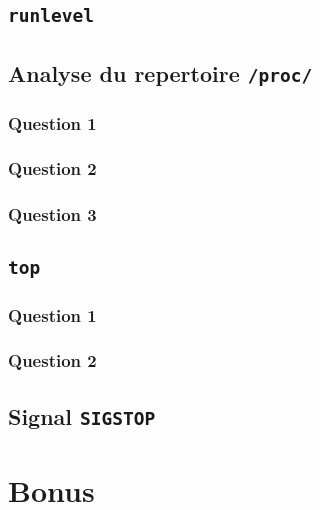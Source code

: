 \documentclass[]{article}
\begin{document}
\hypertarget{runlevel}{%
\subsection{\texorpdfstring{\texttt{runlevel}}{runlevel}}\label{runlevel}}

\hypertarget{analyse-du-repertoire-proc}{%
\subsection{\texorpdfstring{Analyse du repertoire
\texttt{/proc/}}{Analyse du repertoire /proc/}}\label{analyse-du-repertoire-proc}}

\hypertarget{question-1-5}{%
\subsubsection{Question 1}\label{question-1-5}}

\hypertarget{question-2-2}{%
\subsubsection{Question 2}\label{question-2-2}}

\hypertarget{question-3-1}{%
\subsubsection{Question 3}\label{question-3-1}}

\hypertarget{top}{%
\subsection{\texorpdfstring{\texttt{top}}{top}}\label{top}}

\hypertarget{question-1-6}{%
\subsubsection{Question 1}\label{question-1-6}}

\hypertarget{question-2-3}{%
\subsubsection{Question 2}\label{question-2-3}}

\hypertarget{signal-sigstop}{%
\subsection{\texorpdfstring{Signal
\texttt{SIGSTOP}}{Signal SIGSTOP}}\label{signal-sigstop}}

\hypertarget{bonus}{%
\section{Bonus}\label{bonus}}
\end{document}
